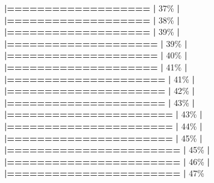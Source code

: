 \documentclass[
]{book}
\newenvironment{Shaded}{\begin{snugshade}}{\end{snugshade}}
\newcommand{\DecValTok}[1]{\textcolor[rgb]{0.00,0.00,0.81}{#1}}
\newcommand{\ErrorTok}[1]{\textcolor[rgb]{0.64,0.00,0.00}{\textbf{#1}}}
\newcommand{\NormalTok}[1]{#1}
\newcommand{\SpecialCharTok}[1]{\textcolor[rgb]{0.81,0.36,0.00}{\textbf{#1}}}
\begin{document}
\begin{Shaded}
\begin{Highlighting}[]
  \ErrorTok{|===================}                               \ErrorTok{|}  \DecValTok{37}\NormalTok{\%}
  \SpecialCharTok{|}                                                        
  \ErrorTok{|===================}                               \ErrorTok{|}  \DecValTok{38}\NormalTok{\%}
  \SpecialCharTok{|}                                                        
  \ErrorTok{|===================}                               \ErrorTok{|}  \DecValTok{39}\NormalTok{\%}
  \SpecialCharTok{|}                                                        
  \ErrorTok{|====================}                              \ErrorTok{|}  \DecValTok{39}\NormalTok{\%}
  \SpecialCharTok{|}                                                        
  \ErrorTok{|====================}                              \ErrorTok{|}  \DecValTok{40}\NormalTok{\%}
  \SpecialCharTok{|}                                                        
  \ErrorTok{|====================}                              \ErrorTok{|}  \DecValTok{41}\NormalTok{\%}
  \SpecialCharTok{|}                                                        
  \ErrorTok{|=====================}                             \ErrorTok{|}  \DecValTok{41}\NormalTok{\%}
  \SpecialCharTok{|}                                                        
  \ErrorTok{|=====================}                             \ErrorTok{|}  \DecValTok{42}\NormalTok{\%}
  \SpecialCharTok{|}                                                        
  \ErrorTok{|=====================}                             \ErrorTok{|}  \DecValTok{43}\NormalTok{\%}
  \SpecialCharTok{|}                                                        
  \ErrorTok{|======================}                            \ErrorTok{|}  \DecValTok{43}\NormalTok{\%}
  \SpecialCharTok{|}                                                        
  \ErrorTok{|======================}                            \ErrorTok{|}  \DecValTok{44}\NormalTok{\%}
  \SpecialCharTok{|}                                                        
  \ErrorTok{|======================}                            \ErrorTok{|}  \DecValTok{45}\NormalTok{\%}
  \SpecialCharTok{|}                                                        
  \ErrorTok{|=======================}                           \ErrorTok{|}  \DecValTok{45}\NormalTok{\%}
  \SpecialCharTok{|}                                                        
  \ErrorTok{|=======================}                           \ErrorTok{|}  \DecValTok{46}\NormalTok{\%}
  \SpecialCharTok{|}                                                        
  \ErrorTok{|=======================}                           \ErrorTok{|}  \DecValTok{47}\NormalTok{\%}

\end{Highlighting}
\end{Shaded}
\end{document}
